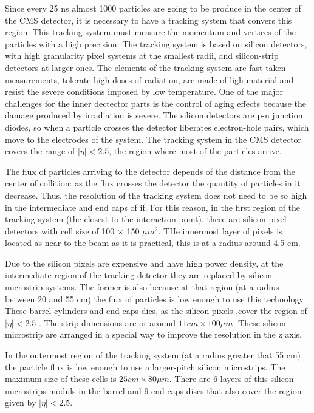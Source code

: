 Since every 25 ns almost 1000 particles are going to be produce in the center of the CMS detector, it is necessary to have a tracking system that convers this region. This tracking system must measure the momentum and vertices of the particles with a high precision. The tracking system is based on silicon detectors, with high granularity pixel systems at the smallest radii, and silicon-strip detectors at larger ones. 
The elements of the tracking system are fast taken measurements, tolerate high doses of radiation, are made of ligh material and resist the severe conditions imposed by low temperature. One of the major challenges for the inner dectector parts is the control of aging effects because the damage produced by irradiation is severe. The silicon detectors are p-n junction diodes, so when a particle crosses the detector liberates electron-hole pairs, which move to the electrodes of the system. The tracking system in the CMS detector covers the range of $| \eta|<2.5$, the region where most of the particles arrive. 

The flux of particles arriving to the detector depends of the distance from the center of collition: as the flux crosses the detector the quantity of particles in it decrease. Thus, the resolution of the tracking system does not need to be so high in the intermediate and end caps of if. For this reason, in the first region of the tracking system (the closest to the interaction point), there are silicon pixel detectors with cell size of 100 $\times$ 150 $\mu m^2$. THe innermost layer of pixels is located as near to the beam as it is practical, this is at a radius around 4.5 cm.

Due to the silicon pixels are expensive and have high power density, at the intermediate region of the tracking detector they are replaced by silicon microstrip systems. The former is also because at that region (at a radius between 20 and 55 cm) the flux of particles is low enough to use this technology. These barrel cylinders and end-caps dics, as the silicon pixels ,cover the region of $|\eta| < 2.5$ . The strip dimensions are or around $11 cm \times 100 \mu m$. These silicon microstrip are arranged in a special way to improve the resolution in the z axis. 

In the outermost region of the tracking system (at a radius greater that 55 cm) the particle flux is low enough to use a larger-pitch silicon microstrips. The maximum size of these cells is $25cm \times 80 \mu m$. There are 6 layers of this silicon microstrips moduls in the barrel and 9 end-caps discs that also cover the region given by $|\eta|< 2.5$.


